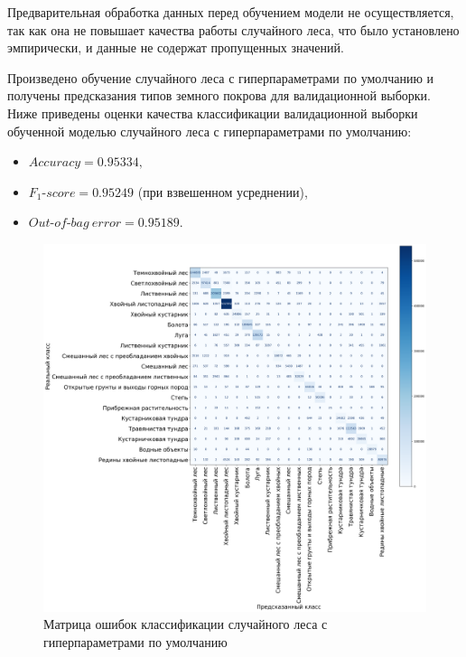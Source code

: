 \documentclass[14pt, a4paper, oneside]{extarticle}
\begin{document}
Предварительная обработка данных перед обучением модели не осуществляется, так как она не повышает качества работы случайного леса, что было установлено эмпирически, и данные не содержат пропущенных значений.

Произведено обучение случайного леса с гиперпараметрами по умолчанию и получены предсказания типов земного покрова для валидационной выборки. Ниже приведены оценки качества классификации валидационной выборки обученной моделью случайного леса с гиперпараметрами по умолчанию:
\begin{itemize}
    \item[] $Accuracy = 0.95334,$
    \item[] $F_1\mbox{-}score = 0.95249$ (при взвешенном усреднении),
    \item[] $Out\mbox{-}of\mbox{-}bag\ error = 0.95189.$
\end{itemize}

\begin{figure}[H]
    \caption{Матрица ошибок классификации случайного леса с гиперпараметрами по умолчанию}
    \centering
    \includegraphics[scale=0.33]{confusion-matrix-1}
\end{figure}
\end{document}
